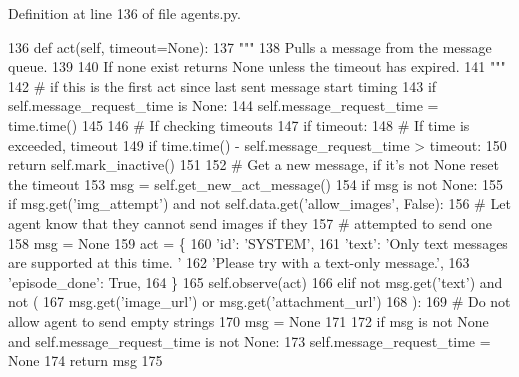 Definition at line 136 of file agents.\+py.


\begin{DoxyCode}
136     \textcolor{keyword}{def }act(self, timeout=None):
137         \textcolor{stringliteral}{"""}
138 \textcolor{stringliteral}{        Pulls a message from the message queue.}
139 \textcolor{stringliteral}{}
140 \textcolor{stringliteral}{        If none exist returns None unless the timeout has expired.}
141 \textcolor{stringliteral}{        """}
142         \textcolor{comment}{# if this is the first act since last sent message start timing}
143         \textcolor{keywordflow}{if} self.message\_request\_time \textcolor{keywordflow}{is} \textcolor{keywordtype}{None}:
144             self.message\_request\_time = time.time()
145 
146         \textcolor{comment}{# If checking timeouts}
147         \textcolor{keywordflow}{if} timeout:
148             \textcolor{comment}{# If time is exceeded, timeout}
149             \textcolor{keywordflow}{if} time.time() - self.message\_request\_time > timeout:
150                 \textcolor{keywordflow}{return} self.mark\_inactive()
151 
152         \textcolor{comment}{# Get a new message, if it's not None reset the timeout}
153         msg = self.get\_new\_act\_message()
154         \textcolor{keywordflow}{if} msg \textcolor{keywordflow}{is} \textcolor{keywordflow}{not} \textcolor{keywordtype}{None}:
155             \textcolor{keywordflow}{if} msg.get(\textcolor{stringliteral}{'img\_attempt'}) \textcolor{keywordflow}{and} \textcolor{keywordflow}{not} self.data.get(\textcolor{stringliteral}{'allow\_images'}, \textcolor{keyword}{False}):
156                 \textcolor{comment}{# Let agent know that they cannot send images if they}
157                 \textcolor{comment}{# attempted to send one}
158                 msg = \textcolor{keywordtype}{None}
159                 act = \{
160                     \textcolor{stringliteral}{'id'}: \textcolor{stringliteral}{'SYSTEM'},
161                     \textcolor{stringliteral}{'text'}: \textcolor{stringliteral}{'Only text messages are supported at this time. '}
162                     \textcolor{stringliteral}{'Please try with a text-only message.'},
163                     \textcolor{stringliteral}{'episode\_done'}: \textcolor{keyword}{True},
164                 \}
165                 self.observe(act)
166             \textcolor{keywordflow}{elif} \textcolor{keywordflow}{not} msg.get(\textcolor{stringliteral}{'text'}) \textcolor{keywordflow}{and} \textcolor{keywordflow}{not} (
167                 msg.get(\textcolor{stringliteral}{'image\_url'}) \textcolor{keywordflow}{or} msg.get(\textcolor{stringliteral}{'attachment\_url'})
168             ):
169                 \textcolor{comment}{# Do not allow agent to send empty strings}
170                 msg = \textcolor{keywordtype}{None}
171 
172             \textcolor{keywordflow}{if} msg \textcolor{keywordflow}{is} \textcolor{keywordflow}{not} \textcolor{keywordtype}{None} \textcolor{keywordflow}{and} self.message\_request\_time \textcolor{keywordflow}{is} \textcolor{keywordflow}{not} \textcolor{keywordtype}{None}:
173                 self.message\_request\_time = \textcolor{keywordtype}{None}
174         \textcolor{keywordflow}{return} msg
175 
\end{DoxyCode}
